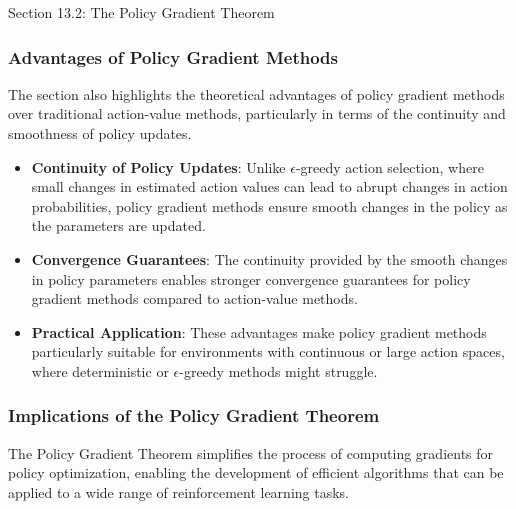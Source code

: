 \begin{notes}{Section 13.2: The Policy Gradient Theorem}
\begin{highlight}
    \end{highlight}
    
    \subsubsection*{Advantages of Policy Gradient Methods}
    
    The section also highlights the theoretical advantages of policy gradient methods over traditional action-value methods, particularly in terms of the continuity and smoothness of policy updates.
    
    \begin{highlight}
    
        \begin{itemize}
            \item \textbf{Continuity of Policy Updates}: Unlike $\epsilon$-greedy action selection, where small changes in estimated action values can lead to abrupt changes in action probabilities, 
            policy gradient methods ensure smooth changes in the policy as the parameters are updated.
            \item \textbf{Convergence Guarantees}: The continuity provided by the smooth changes in policy parameters enables stronger convergence guarantees for policy gradient methods compared to 
            action-value methods.
            \item \textbf{Practical Application}: These advantages make policy gradient methods particularly suitable for environments with continuous or large action spaces, where deterministic or 
            $\epsilon$-greedy methods might struggle.
        \end{itemize}
    
    \end{highlight}
    
    \subsubsection*{Implications of the Policy Gradient Theorem}
    
    The Policy Gradient Theorem simplifies the process of computing gradients for policy optimization, enabling the development of efficient algorithms that can be applied to a wide range of reinforcement 
    learning tasks.
    
    \begin{highlight}
    

\end{highlight}
\end{notes}
